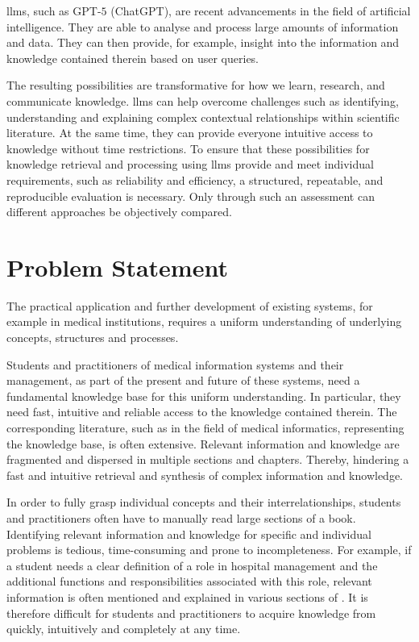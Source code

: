 %
\acp{llm}, such as GPT-$5$ (ChatGPT), are recent advancements in the field of artificial intelligence.
They are able to analyse and process large amounts of information and data.
They can then provide, for example, insight into the information and knowledge contained therein based on user queries.
%

The resulting possibilities are transformative for how we learn, research, and communicate knowledge.
%
\acp{llm} can help overcome challenges such as identifying, understanding and explaining complex contextual relationships within scientific literature.
At the same time, they can provide everyone intuitive access to knowledge without time restrictions.
%
To ensure that these possibilities for knowledge retrieval and processing using \acp{llm} provide and meet individual requirements, such as reliability and efficiency, a structured, repeatable, and reproducible evaluation is necessary. 
Only through such an assessment can different approaches be objectively compared.
%
\section{Problem Statement}\label{sec:problem_statement}

The practical application and further development of existing systems, for example in medical institutions, requires a uniform understanding of underlying concepts, structures and processes.
%

%
Students and practitioners of medical information systems and their management, as part of the present and future of these systems, need a fundamental knowledge base for this uniform understanding.
In particular, they need fast, intuitive and reliable access to the knowledge contained therein.
%
The corresponding literature, such as \citet{bb2} in the field of medical informatics, representing the knowledge base, is often extensive.
Relevant information and knowledge are fragmented and dispersed in multiple sections and chapters.
Thereby, hindering a fast and intuitive retrieval and synthesis of complex information and knowledge.
%

%
In order to fully grasp individual concepts and their interrelationships, students and practitioners often have to manually read large sections of a book.
Identifying relevant information and knowledge for specific and individual problems is tedious, time-consuming and prone to incompleteness.
%
For example, if a student needs a clear definition of a role in hospital management and the additional functions and responsibilities associated with this role, relevant information is often mentioned and explained in various sections of \citet{bb2}.
%
It is therefore difficult for students and practitioners to acquire knowledge from \citet{bb2} quickly, intuitively and completely at any time.
%

